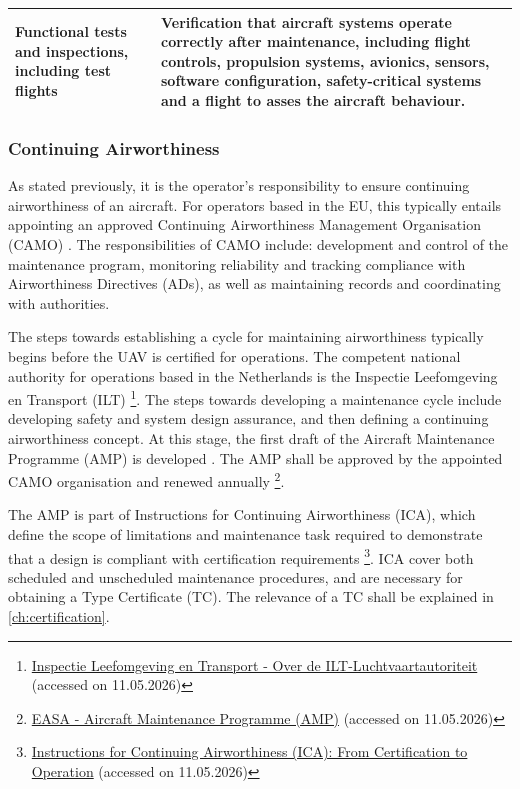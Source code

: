 \begin{longtable}{|p{}| p{}|}
Functional tests and inspections, including test flights &
Verification that aircraft systems operate correctly after maintenance, including flight controls, propulsion systems, avionics, sensors, software configuration, safety-critical systems and a flight to asses the aircraft behaviour. \\
\hline


\end{longtable}

\subsubsection*{Continuing Airworthiness}
As stated previously, it is the operator's responsibility to ensure continuing airworthiness of an aircraft. For operators based in the EU, this typically entails appointing an approved Continuing Airworthiness Management Organisation (CAMO) \cite{EASA_CAirworthiness}. The responsibilities of CAMO include: development and control of the maintenance program, monitoring reliability and tracking compliance with Airworthiness Directives (ADs), as well as maintaining records and coordinating with authorities.

The steps towards establishing a cycle for maintaining airworthiness typically begins before the UAV is certified for operations. The competent national authority for operations based in the Netherlands is the Inspectie Leefomgeving en Transport (ILT) \footnote{\label{url:ILT}\href{https://www.ilent.nl/ilt-luchtvaartautoriteit}{Inspectie Leefomgeving en Transport - Over de ILT-Luchtvaartautoriteit} (accessed on 11.05.2026)}. The steps towards developing a maintenance cycle include developing safety and system design assurance, and then defining a continuing airworthiness concept. At this stage, the first draft of the Aircraft Maintenance Programme (AMP) is developed \cite{EASA_CAirworthiness}. The AMP shall be approved by the appointed CAMO organisation and renewed annually \footnote{\href{https://www.easa.europa.eu/en/the-agency/faqs/amp-aircraft-maintenance-programme}{EASA - Aircraft Maintenance Programme (AMP)} (accessed on 11.05.2026)}.

The AMP is part of Instructions for Continuing Airworthiness (ICA), which define the scope of limitations and maintenance task required to demonstrate that a design is compliant with certification requirements \footnote{\href{https://www.leanairline.com/blog/instructions-for-continuing-airworthiness}{Instructions for Continuing Airworthiness (ICA): From Certification to Operation} (accessed on 11.05.2026)}. ICA cover both scheduled and unscheduled maintenance procedures, and are necessary for obtaining a Type Certificate (TC). The relevance of a TC shall be explained in \autoref{ch:certification}.

